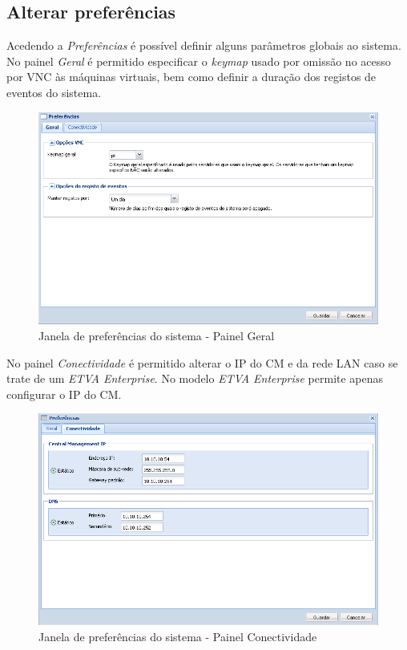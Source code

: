 \subsection{Alterar preferências}
Acedendo a \emph{Preferências} é possível definir alguns parâmetros globais ao sistema.
No painel \emph{Geral} é permitido especificar o \emph{keymap} usado por omissão no acesso por VNC às máquinas virtuais, bem como definir a duração dos registos de eventos do sistema.

\begin{figure}[H]
        \begin{center}
        \includegraphics[scale=0.5]{screenshots/preferences_general.png}
        \caption{Janela de preferências do sistema - Painel Geral}
        \label{fig:preferences_general}
        \end{center}
\end{figure}

No painel \emph{Conectividade} é permitido alterar o IP do CM e da rede LAN caso se trate de um \emph{ETVA Enterprise}. No modelo \emph{ETVA Enterprise} permite apenas configurar o IP do CM.

\begin{figure}[H]
        \begin{center}
        \includegraphics[scale=0.5]{screenshots/preferences_conn.png}
        \caption{Janela de preferências do sistema - Painel Conectividade}
        \label{fig:preferences_conn}
        \end{center}
\end{figure}


